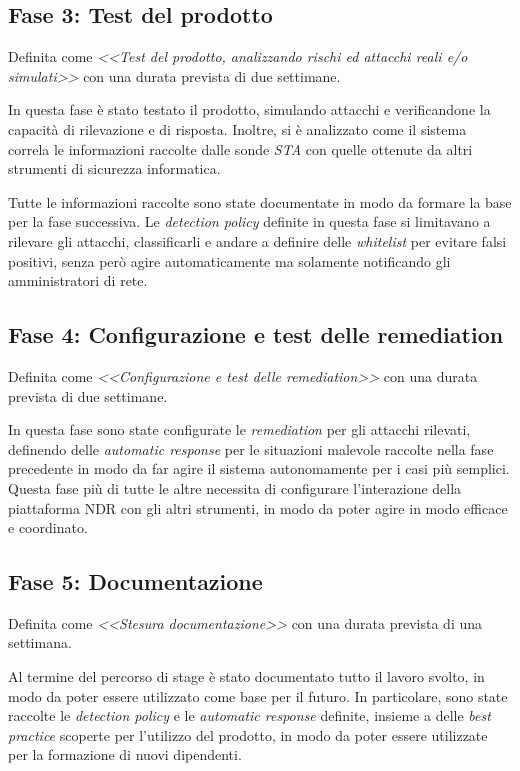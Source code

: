 \subsection{Fase 3: Test del prodotto}

Definita come \emph{<<Test del prodotto, analizzando rischi ed attacchi reali e/o simulati>>} con una durata prevista di due settimane.

In questa fase è stato testato il prodotto, simulando attacchi e verificandone la capacità di rilevazione e di risposta. Inoltre, si è analizzato come il sistema correla le informazioni raccolte dalle sonde \emph{STA} con quelle ottenute da altri strumenti di sicurezza informatica.

Tutte le informazioni raccolte sono state documentate in modo da formare la base per la fase successiva. Le \emph{detection policy} definite in questa fase si limitavano a rilevare gli attacchi, classificarli e andare a definire delle \emph{whitelist} per evitare falsi positivi, senza però agire automaticamente ma solamente notificando gli amministratori di rete.

\subsection{Fase 4: Configurazione e test delle remediation}

Definita come \emph{<<Configurazione e test delle remediation>>} con una durata prevista di due settimane.

In questa fase sono state configurate le \emph{remediation} per gli attacchi rilevati, definendo delle \emph{automatic response} per le situazioni malevole raccolte nella fase precedente in modo da far agire il sistema autonomamente per i casi più semplici. Questa fase più di tutte le altre necessita di configurare l'interazione della piattaforma NDR con gli altri strumenti, in modo da poter agire in modo efficace e coordinato.

\subsection{Fase 5: Documentazione}

Definita come \emph{<<Stesura documentazione>>} con una durata prevista di una settimana.

Al termine del percorso di stage è stato documentato tutto il lavoro svolto, in modo da poter essere utilizzato come base per il futuro. In particolare, sono state raccolte le \emph{detection policy} e le \emph{automatic response} definite, insieme a delle \emph{best practice} scoperte per l'utilizzo del prodotto, in modo da poter essere utilizzate per la formazione di nuovi dipendenti.
